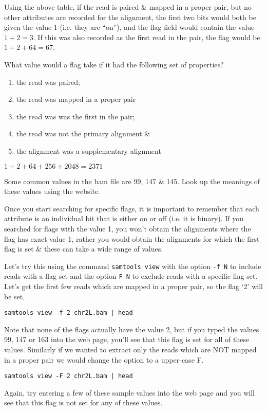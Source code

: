 \begin{information}
Using the above table, if the read is paired \& mapped in a proper pair, but no other attributes are recorded for the alignment, the first two bits would both be given the value 1 (i.e. they are ``on''), and the flag field would contain the value $1 + 2 = 3$.
If this was also recorded as the first read in the pair, the flag would be $1 + 2 + 64 = 67$.
\end{information}

\begin{questions}
What value would a flag take if it had the following set of properties?
	\begin{enumerate}
	\item the read was paired; 
	\item the read was mapped in a proper pair
	\item the read was was the first in the pair; 
	\item the read was not the primary alignment \& 
	\item the alignment was a supplementary alignment
	\end{enumerate}
\begin{answer}
$1 + 2 + 64 + 256 + 2048 = 2371 $ \\
\end{answer}
Some common values in the bam file are 99, 147 \& 145.
Look up the meanings of these values using the website. \\
\end{questions}

\begin{information}
Once you start searching for specific flags, it is important to remember that each attribute is an individual bit that is either on or off (i.e. it is binary).
If you searched for flags with the value 1, you won't obtain the alignments where the flag has exact value 1, rather you would obtain the alignments for which the first flag is set \& these can take a wide range of values.
\end{information}

\begin{steps}
Let's try this using the command \texttt{samtools view} with the option \texttt{-f N} to include reads with a flag set and the option \texttt{F N} to exclude reads with a specific flag set.
Let's get the first few reads which are mapped in a proper pair, so the flag `2' will be set.\\
\begin{lstlisting}
samtools view -f 2 chr2L.bam | head
\end{lstlisting}
Note that none of the flags actually have the value 2, but if you typed the values 99, 147 or 163 into the web page, you'll see that this flag is set for all of these values.
Similarly if we wanted to extract only the reads which are NOT mapped in a proper pair we would change the option to a upper-case F.
\begin{lstlisting}
samtools view -F 2 chr2L.bam | head
\end{lstlisting}
Again, try entering a few of these sample values into the web page and you will see that this flag is not set for any of these values.
\end{steps}

